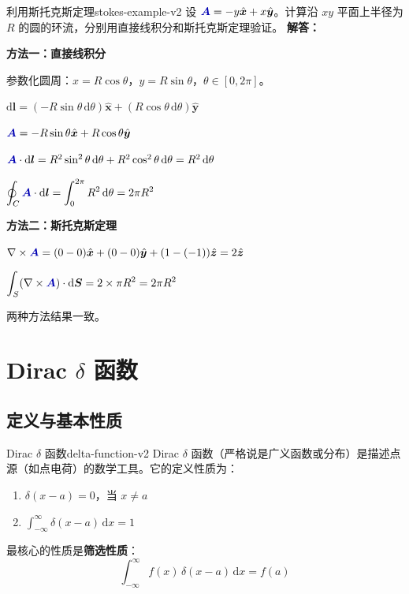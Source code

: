 \documentclass[11pt,a4paper,openany,oneside]{book}
\newcommand{\diff}{\mathrm{d}}
\newcommand{\vecA}{\textcolor{blue!70!black}{\vect{A}}}
\newcommand{\vect}[1]{\bm{#1}}
\newcommand{\unitvec}[1]{\hat{\vect{#1}}}
\newcommand{\curl}{\nabla\times}
\newcommand{\difficulty}[1]{\marginnote{\textcolor{red}{\textbf{[#1]}}}}
\begin{document}
\begin{example}{利用斯托克斯定理}{stokes-example-v2}
\difficulty{提高}
设 $\vecA = -y\unitvec{x} + x\unitvec{y}$。计算沿 $xy$ 平面上半径为 $R$ 的圆的环流，分别用直接线积分和斯托克斯定理验证。
\tcblower
\textbf{解答：}

\textbf{方法一：直接线积分}

参数化圆周：$x = R\cos\theta$，$y = R\sin\theta$，$\theta \in [0, 2\pi]$。

$\diff\vect{l} = (-R\sin\theta\,\diff\theta)\unitvec{x} + (R\cos\theta\,\diff\theta)\unitvec{y}$

$\vecA = -R\sin\theta\unitvec{x} + R\cos\theta\unitvec{y}$

$\vecA \cdot \diff\vect{l} = R^2\sin^2\theta\,\diff\theta + R^2\cos^2\theta\,\diff\theta = R^2\,\diff\theta$

$\displaystyle\oint_C \vecA \cdot \diff\vect{l} = \int_0^{2\pi} R^2\,\diff\theta = 2\pi R^2$

\textbf{方法二：斯托克斯定理}

$\curl\vecA = (0 - 0)\unitvec{x} + (0 - 0)\unitvec{y} + (1 - (-1))\unitvec{z} = 2\unitvec{z}$

$\displaystyle\int_S (\curl\vecA) \cdot \diff\vect{S} = 2 \times \pi R^2 = 2\pi R^2$

两种方法结果一致。
\end{example}

\section{Dirac \texorpdfstring{$\delta$}{δ} 函数}

\subsection{定义与基本性质}

\begin{definition}{Dirac $\delta$ 函数}{delta-function-v2}
Dirac $\delta$ 函数（严格说是广义函数或分布）是描述点源（如点电荷）的数学工具。它的定义性质为：
\begin{enumerate}
\item $\delta(x-a) = 0$，当 $x \neq a$
\item $\displaystyle\int_{-\infty}^{\infty} \delta(x-a) \, \diff x = 1$
\end{enumerate}
最核心的性质是\textbf{筛选性质}：
\[
\int_{-\infty}^{\infty} f(x) \, \delta(x-a) \, \diff x = f(a)
\]
\end{definition}
\end{document}
